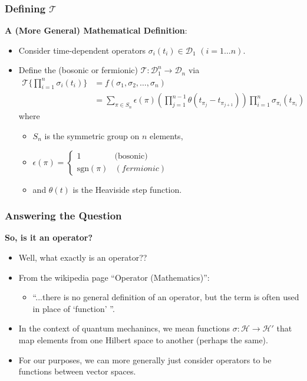 \documentclass{beamer}
\begin{document}
\begin{frame}
    \frametitle{Defining $\mathscr{T}$}
    \alert{\textbf{A (More General) Mathematical Definition}:}
    \begin{itemize}
        \item[\textbullet]<2-> Consider time-dependent operators $\sigma_i(t_i)\in\mathcal{D}_1$ $(i=1\ldots n)$.
        \item[\textbullet]<3-> Define the (bosonic or fermionic) $\mathscr{T}:\mathcal{D}_1^n\to \mathcal{D}_n$ via
        \begin{align*}
            \mathscr{T}\{\prod_{i=1}^{n} \sigma_i(t_i)\} &= f(\sigma_1, \sigma_2, \ldots, \sigma_n) \\
            &= \sum_{\pi\in S_n}\epsilon(\pi)\left(\prod_{j=1}^{n-1}\theta(t_{\pi_j} - t_{\pi_{j+1}})\right)\prod_{i=1}^n\sigma_{\pi_i}(t_{\pi_i})
        \end{align*}
        where 
        \begin{itemize}
            \item[\textbullet]<4-> $S_n$ is the symmetric group on $n$ elements,
            \item[\textbullet]<5-> $\epsilon(\pi) = \begin{cases}
                1 & \text{(bosonic)} \\
                \text{sgn}(\pi) & (fermionic)
             \end{cases}$
            \item[\textbullet]<6-> and $\theta(t)$ is the Heaviside step function.
        \end{itemize}
    \end{itemize}
\end{frame}

\begin{frame}
\frametitle{Answering the Question}
\alert{\textbf{So, is it an operator?}}
\begin{itemize}
    \item[\textbullet]<2-> Well, what exactly is an operator??
    \item[\textbullet]<3-> From the wikipedia page ``Operator (Mathematics)'': 
    \begin{itemize}
        \item[\textbullet]<3-> ``...there is no general definition of an operator, but the term is often used in place of `function' ''.
    \end{itemize}
    \item[\textbullet]<4-> In the context of quantum mechanincs, we mean functions $\sigma: \mathcal{H} \to \mathcal{H}'$ that map elements from one Hilbert space to another (perhaps the same).
    \item[\textbullet]<5-> For our purposes, we can more generally just consider operators to be functions between vector spaces.
\end{itemize}

\end{frame}
\end{document}
